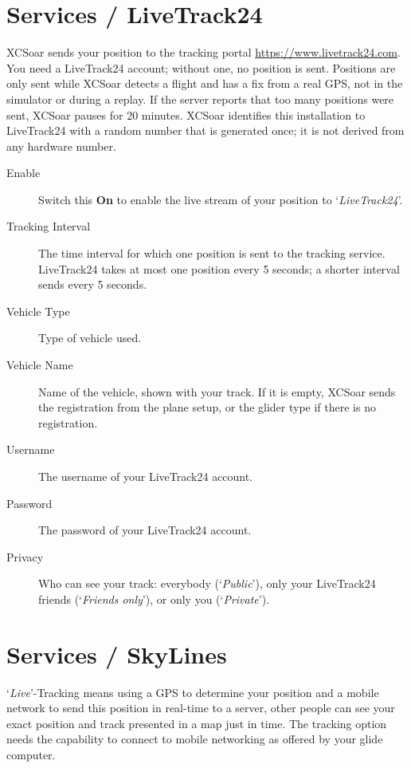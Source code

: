 \section{Services / LiveTrack24}

XCSoar sends your position to the tracking portal
\url{https://www.livetrack24.com}.  You need a LiveTrack24 account;
without one, no position is sent.  Positions are only sent while
XCSoar detects a flight and has a fix from a real GPS, not in the
simulator or during a replay.  If the server reports that too many
positions were sent, XCSoar pauses for 20 minutes.  XCSoar
identifies this installation to LiveTrack24 with a random number that
is generated once; it is not derived from any hardware number.

\begin{description}
\item[Enable]  Switch this {\bf On} to enable the live stream of 
  your position to `{\em LiveTrack24}'.
\item[Tracking Interval]  The time interval for which one position is sent to
  the tracking service.  LiveTrack24 takes at most one position every
  5 seconds; a shorter interval sends every 5 seconds.
\item[Vehicle Type]  Type of vehicle used.
\item[Vehicle Name]  Name of the vehicle, shown with your track.  If it
  is empty, XCSoar sends the registration from the plane setup, or
  the glider type if there is no registration.
\item[Username]  The username of your LiveTrack24 account.
\item[Password]  The password of your LiveTrack24 account.
\item[Privacy]  Who can see your track: everybody (`{\em Public}'), only
  your LiveTrack24 friends (`{\em Friends only}'), or only you
  (`{\em Private}').
\end{description}


\section{Services / SkyLines}

`{\it Live}'-Tracking means using a GPS to determine your position and a mobile 
network to send this position in real-time to a server, other people can see 
your exact position and track presented in a map just in time.
The tracking option needs the capability to connect to mobile networking as offered by 
your glide computer.


